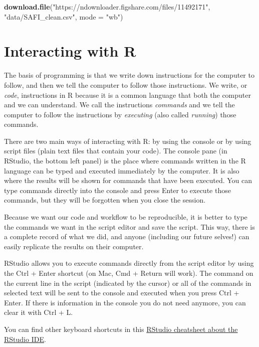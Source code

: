 \documentclass[]{book}
\newenvironment{Shaded}{\begin{snugshade}}{\end{snugshade}}
\newcommand{\KeywordTok}[1]{\textcolor[rgb]{0.13,0.29,0.53}{\textbf{#1}}}
\newcommand{\DataTypeTok}[1]{\textcolor[rgb]{0.13,0.29,0.53}{#1}}
\newcommand{\StringTok}[1]{\textcolor[rgb]{0.31,0.60,0.02}{#1}}
\newcommand{\NormalTok}[1]{#1}
\begin{document}
\begin{Shaded}
\begin{Highlighting}[]
\KeywordTok{download.file}\NormalTok{(}\StringTok{"https://ndownloader.figshare.com/files/11492171"}\NormalTok{,}
              \StringTok{"data/SAFI_clean.csv"}\NormalTok{, }\DataTypeTok{mode =} \StringTok{"wb"}\NormalTok{)}
\end{Highlighting}
\end{Shaded}

\section{Interacting with R}\label{interacting-with-r}

The basis of programming is that we write down instructions for the
computer to follow, and then we tell the computer to follow those
instructions. We write, or \emph{code}, instructions in R because it is
a common language that both the computer and we can understand. We call
the instructions \emph{commands} and we tell the computer to follow the
instructions by \emph{executing} (also called \emph{running}) those
commands.

There are two main ways of interacting with R: by using the console or
by using script files (plain text files that contain your code). The
console pane (in RStudio, the bottom left panel) is the place where
commands written in the R language can be typed and executed immediately
by the computer. It is also where the results will be shown for commands
that have been executed. You can type commands directly into the console
and press Enter to execute those commands, but they will be forgotten
when you close the session.

Because we want our code and workflow to be reproducible, it is better
to type the commands we want in the script editor and save the script.
This way, there is a complete record of what we did, and anyone
(including our future selves!) can easily replicate the results on their
computer.

RStudio allows you to execute commands directly from the script editor
by using the Ctrl + Enter shortcut (on Mac, Cmd + Return will work). The
command on the current line in the script (indicated by the cursor) or
all of the commands in selected text will be sent to the console and
executed when you press Ctrl + Enter. If there is information in the
console you do not need anymore, you can clear it with Ctrl + L.

You can find other keyboard shortcuts in this
\href{https://github.com/rstudio/cheatsheets/raw/master/rstudio-ide.pdf}{RStudio
cheatsheet about the RStudio IDE}.
\end{document}

